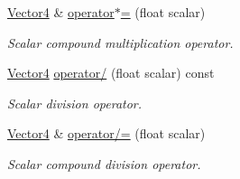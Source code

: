 \begin{DoxyCompactItemize}
\hyperlink{classchaos_1_1gfx_1_1_vector4}{Vector4} \& \hyperlink{classchaos_1_1gfx_1_1_vector4_ae171d478578a7a1564ca3e869da3b3f8}{operator$\ast$=} (float scalar)
\begin{DoxyCompactList}\small\item\em Scalar compound multiplication operator. \end{DoxyCompactList}\item 
\hyperlink{classchaos_1_1gfx_1_1_vector4}{Vector4} \hyperlink{classchaos_1_1gfx_1_1_vector4_accffe88c758a09b13b68ee1692663de9}{operator/} (float scalar) const 
\begin{DoxyCompactList}\small\item\em Scalar division operator. \end{DoxyCompactList}\item 
\hyperlink{classchaos_1_1gfx_1_1_vector4}{Vector4} \& \hyperlink{classchaos_1_1gfx_1_1_vector4_a1ce1c817fbc1999faeb34d08f4df284b}{operator/=} (float scalar)
\begin{DoxyCompactList}\small\item\em Scalar compound division operator. \end{DoxyCompactList}\end{DoxyCompactItemize}
